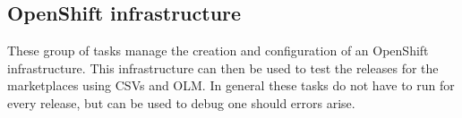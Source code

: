 \subsection{OpenShift infrastructure}\label{subsec:openshift-infrastructure}

These group of tasks manage the creation and configuration of an OpenShift infrastructure.
This infrastructure can then be used to test the releases for the marketplaces using CSVs and OLM.
In general these tasks do not have to run for every release, but can be used to debug one should errors arise.















